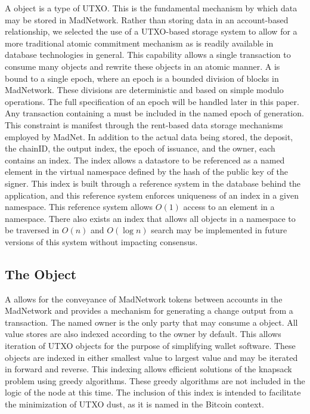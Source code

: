 A \DataStore{} object is a type of UTXO.
This is the fundamental mechanism by which data may be stored in MadNetwork.
Rather than storing data in an account-based relationship, we selected
the use of a UTXO-based storage system to allow for a more traditional
atomic commitment mechanism as is readily available in database
technologies in general.
This capability allows a single transaction to consume many \DataStore{}
objects and rewrite these objects in an atomic manner.
A \DataStore{} is bound to a single epoch, where an epoch is a bounded
division of blocks in MadNetwork.
These divisions are deterministic and based on simple modulo operations.
The full specification of an epoch will be handled later in this paper.
Any transaction containing a \DataStore{} must be included in the named
epoch of generation.
This constraint is manifest through the rent-based data storage
mechanisms employed by MadNet.
In addition to the actual data being stored, the deposit, the chainID,
the output index, the epoch of issuance, and the owner, each \DataStore{} contains
an index.
The index allows a datastore to be referenced as a named element in the
virtual namespace defined by the hash of the public key of the
\DataStore{} signer.
This index is built through a reference system in the database behind
the application, and this reference system enforces uniqueness of an
index in a given namespace.
This reference system allows $O(1)$ access to an element in a namespace.
There also exists an index that allows all objects in a namespace to be
traversed in $O(n)$ and $O(\log n)$ search may be implemented in future
versions of this system without impacting consensus.


\subsection{The \ValueStore{} Object}



A \ValueStore{} allows for the conveyance of MadNetwork tokens between
accounts in the MadNetwork and provides a mechanism for generating a
change output from a transaction.
The named owner is the only party that may consume a \ValueStore{} object.
All value stores are also indexed according to the owner by default.
This allows iteration of UTXO objects for the purpose of simplifying
wallet software.
These objects are indexed in either smallest value to largest value and
may be iterated in forward and reverse.
This indexing allows efficient solutions of the knapsack problem using
greedy algorithms.
These greedy algorithms are not included in the logic of the node at
this time.
The inclusion of this index is intended to facilitate the minimization
of UTXO dust, as it is named in the Bitcoin context.


